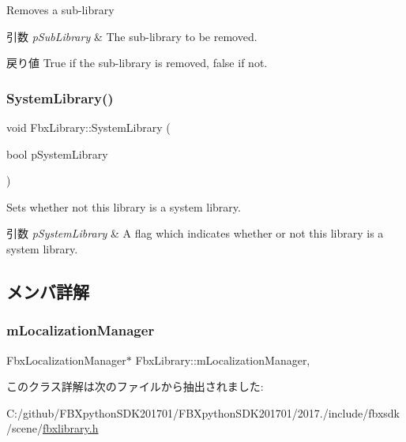 Removes a sub-\/library 
\begin{DoxyParams}{引数}
{\em p\+Sub\+Library} & The sub-\/library to be removed. \\
\hline
\end{DoxyParams}
\begin{DoxyReturn}{戻り値}
{\ttfamily True} if the sub-\/library is removed, {\ttfamily false} if not. 
\end{DoxyReturn}
\mbox{\label{class_fbx_library_a4746780aa4ba19fdbf1462fb371967c9}} 
\subsubsection{\texorpdfstring{System\+Library()}{SystemLibrary()}}
{\footnotesize\ttfamily void Fbx\+Library\+::\+System\+Library (\begin{DoxyParamCaption}\item[{bool}]{p\+System\+Library }\end{DoxyParamCaption})}

Sets whether not this library is a system library. 
\begin{DoxyParams}{引数}
{\em p\+System\+Library} & A flag which indicates whether or not this library is a system library. \\
\hline
\end{DoxyParams}


\subsection{メンバ詳解}
\mbox{\label{class_fbx_library_ac240173ce32053acf9cc390b82dc69e5}} 
\subsubsection{\texorpdfstring{m\+Localization\+Manager}{mLocalizationManager}}
{\footnotesize\ttfamily Fbx\+Localization\+Manager$\ast$ Fbx\+Library\+::m\+Localization\+Manager\hspace{0.3cm}{\ttfamily [mutable]}, {\ttfamily [protected]}}



このクラス詳解は次のファイルから抽出されました\+:\begin{DoxyCompactItemize}
\item 
C\+:/github/\+F\+B\+Xpython\+S\+D\+K201701/\+F\+B\+Xpython\+S\+D\+K201701/2017./include/fbxsdk/scene/\hyperlink{fbxlibrary_8h}{fbxlibrary.\+h}\end{DoxyCompactItemize}
